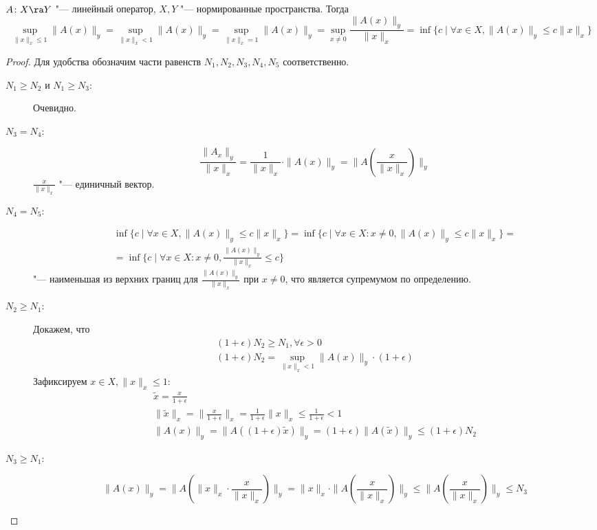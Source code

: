 \begin{theorem}
	$A \colon X \ra Y$ "--- линейный оператор, $X, Y$ "--- нормированные пространства.
	Тогда
	\[
		\sup_{\|x\|_x \le 1} \|A(x)\|_y
			= \sup_{\|x\|_x < 1} \|A(x)\|_y
			= \sup_{\|x\|_x = 1} \|A(x)\|_y
			= \sup_{x \ne 0} \frac{\|A(x)\|_y}{\|x\|_x}
			= \inf \{c \mid \forall x \in X, \|A(x)\|_y \le c\|x\|_x\}
	\]
\end{theorem}
\begin{proof}
	Для удобства обозначим части равенств $N_1, N_2, N_3, N_4, N_5$ соответственно.
	\begin{description}
	\item[$N_1 \ge N_2$ и $N_1 \ge N_3$:]
		Очевидно.

	\item[$N_3 = N_4$:]
		\[ \frac{\|A_x\|_y}{\|x\|_x} = \frac{1}{\|x\|_x} \cdot \|A(x)\|_y = \|A(\frac{x}{\|x\|_x})\|_y \]
		$\frac{x}{\|x\|_x}$ "--- единичный вектор.

	\item[$N_4 = N_5$:]
		\begin{gather*}
			\inf\{c \mid \forall x \in X, \|A(x)\|_y \le c\|x\|_x\}
				= \inf \{c \mid \forall x \in X\colon x \ne 0, \|A(x)\|_y \le c\|x\|_x\} = \\
			= \inf \{c \mid \forall x \in X\colon x \ne 0, \frac{\|A(x)\|_y}{\|x\|_x} \le c\}
		\end{gather*}
		"--- наименьшая из верхних границ для $\frac{\|A(x)\|_y}{\|x\|_x}$ при $x \ne 0$, что является супремумом по определению.

	\item[$N_2 \ge N_1$:]
		Докажем, что
		\begin{gather*}
			(1+ \epsilon)N_2 \ge N_1,  \forall \epsilon > 0 \\
			(1+ \epsilon)N_2 = \sup_{\|x\|_x < 1} \|A(x)\|_y \cdot (1 + \epsilon)
		\end{gather*}
		Зафиксируем $x \in X, \|x\|_x \le 1$:
		\begin{gather*}
			\tilde x = \frac{x}{1 + \epsilon} \\
			\|\tilde x\|_x = \|\frac{x}{1 + \epsilon}\|_x = \frac{1}{1 + \epsilon} \|x\|_x \le \frac{1}{1 + \epsilon} < 1 \\
			\|A(x)\|_y = \|A((1 + \epsilon)\tilde x)\|_y = (1 + \epsilon)\|A(\tilde x)\|_y \le (1+\epsilon)N_2
		\end{gather*}

	\item[$N_3 \ge N_1$:]
		\[
			\|A(x)\|_y = \|A(\|x\|_x \cdot \frac{x}{\|x\|_x})\|_y = \|x\|_x \cdot \|A(\frac{x}{\|x\|_x})\|_y
				\le \|A(\frac{x}{\|x\|_x})\|_y \le N_3
		\]
	\end{description}
\end{proof}

